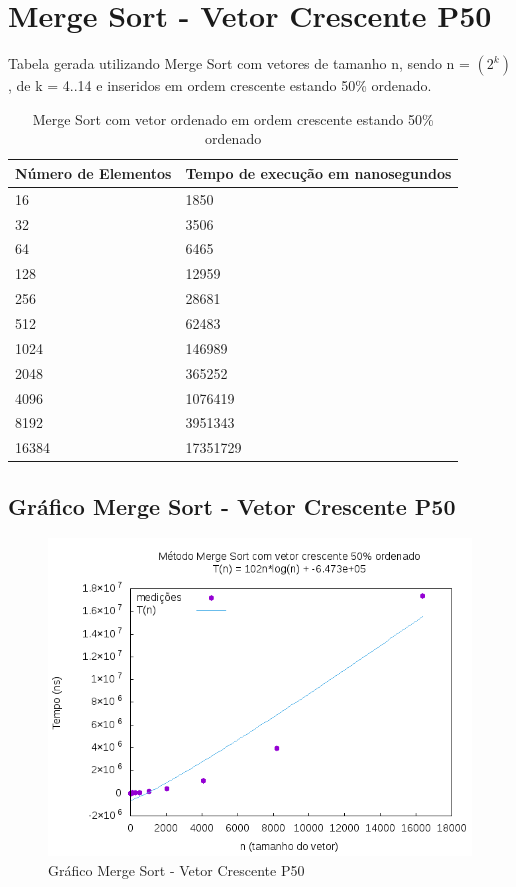 \documentclass[12pt,a4paper,twoside]{report}
\begin{document}
\section{Merge Sort - Vetor Crescente P50}
Tabela gerada utilizando Merge Sort com vetores de tamanho n, sendo n = $(2^k)$, de k = 4..14 e inseridos em ordem crescente estando 50\% ordenado.
\begin{table}[H]
\centering
\caption{Merge Sort com vetor ordenado em ordem crescente estando 50\% ordenado}
\label{my-label}
\begin{tabular}{|l|l|}
\hline
\multicolumn{1}{|c|}{\textbf{Número de Elementos}} & \multicolumn{1}{c|}{\textbf{Tempo de execução em nanosegundos}} \\ \hline
16 & 1850 \\ \hline
32 & 3506 \\ \hline
64 & 6465 \\ \hline
128 & 12959 \\ \hline
256 & 28681 \\ \hline
512 & 62483 \\ \hline
1024 & 146989 \\ \hline
2048 & 365252 \\ \hline
4096 & 1076419 \\ \hline
8192 & 3951343 \\ \hline
16384 & 17351729 \\ \hline
\end{tabular}
\end{table}

\subsection{Gráfico Merge Sort - Vetor Crescente P50}
\begin{figure}[H]
    \centering
    \includegraphics[width=0.7\linewidth]{graficos/MergeSort/vIntCrescenteP50/vIntCrescenteP50.png}
  \caption{Gráfico Merge Sort - Vetor Crescente P50}
\end{figure}
\end{document}
